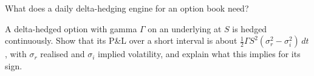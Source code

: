 \begin{interviewq}\label{iq:s2:harvesting-the-variance-risk-premium:5}
What does a daily delta-hedging engine for an option book need?
\end{interviewq}

\begin{interviewq}\label{iq:s2:harvesting-the-variance-risk-premium:6}
A delta-hedged option with gamma $\Gamma$ on an underlying at $S$ is hedged continuously. Show that its P\&L over a short interval is about
$\tfrac12\Gamma S^2(\sigma_r^2 - \sigma_i^2)\,dt$, with $\sigma_r$ realised and $\sigma_i$ implied volatility, and explain what this implies for its sign.
\end{interviewq}
